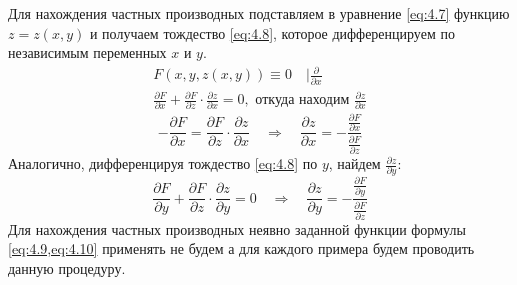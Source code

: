 Для нахождения частных производных подставляем в уравнение \cref{eq:4.7} функцию $z = z(x,y)$ и получаем тождество \cref{eq:4.8}, которое дифференцируем по независимым переменных $x$ и $y$.
\begin{gather*}
	F(x,y,z(x,y)) \equiv 0 \quad | \frac{\partial }{\partial x}\\
	\frac{\partial F}{\partial x} + \frac{\partial F}{\partial z} \cdot \frac{\partial z}{\partial x} = 0, \text{ откуда находим $\frac{\partial z}{\partial x}$}
\end{gather*}
\begin{equation} \label{eq:4.9}
	-\frac{\partial F}{\partial x} = \frac{\partial F}{\partial z} \cdot \frac{\partial z}{\partial x} \quad \Rightarrow \quad \boxed{\frac{\partial z}{\partial x} = -\frac{\frac{\partial F}{\partial x}}{\frac{\partial F}{\partial z}}}
\end{equation}
Аналогично, дифференцируя тождество \cref{eq:4.8} по $y$, найдем $\frac{\partial z}{\partial y}$:
\begin{equation} \label{eq:4.10}
	\frac{\partial F}{\partial y} + \frac{\partial F}{\partial z} \cdot \frac{\partial z}{\partial y} = 0 \quad \Rightarrow \quad \boxed{\frac{\partial z}{\partial y} = - \frac{\frac{\partial F}{\partial y}}{\frac{\partial F}{\partial z}}}
\end{equation}
Для нахождения частных производных неявно заданной функции формулы \cref{eq:4.9,eq:4.10} применять не будем а для каждого примера будем проводить данную процедуру.
